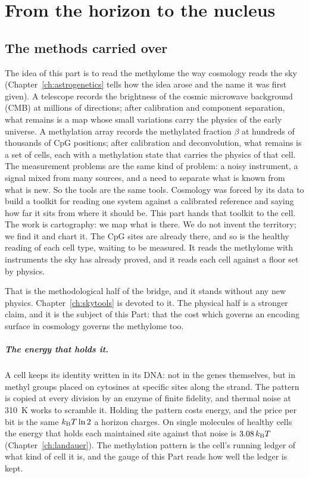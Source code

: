 \chapter{From the horizon to the nucleus}\label{ch:bridge}

\section{The methods carried over}

The idea of this part is to read the methylome the way
cosmology reads the sky (Chapter~\ref{ch:astrogenetics} tells how the idea arose and the name it was first given). A telescope records the brightness of the cosmic microwave background
(CMB) at millions of directions; after calibration and component separation, what remains is a map
whose small variations carry the physics of the early universe. A methylation array records the
methylated fraction $\beta$ at hundreds of thousands of CpG positions; after calibration and
deconvolution, what remains is a set of cells, each with a methylation state that carries the
physics of that cell. The measurement problems are the same kind of problem: a noisy instrument, a
signal mixed from many sources, and a need to separate what is known from what is new. So the
tools are the same tools.
Cosmology was forced by its data to build a toolkit for reading one system against a calibrated reference and saying how far it sits from
where it should be. This part hands that toolkit to the cell. The work is cartography: we map what is there. We do not invent the
territory; we find it and chart it. The CpG sites are already there, and so is the healthy reading of each cell type, waiting to be
measured. It reads the methylome with instruments the sky has already proved, and it reads each cell against a floor set by physics. \analogy

That is the methodological half of the bridge, and it stands without any new physics. Chapter~\ref{ch:skytools} is
devoted to it. The physical half is a stronger claim, and it is the subject of this Part: that the
cost which governs an encoding surface in cosmology governs the methylome too.
\paragraph{The energy that holds it.} A cell keeps its identity written in its DNA: not in the genes themselves, but in methyl groups placed
on cytosines at specific sites along the strand. The pattern is copied at every division by an enzyme of finite fidelity, and thermal noise
at 310~K works to scramble it. Holding the pattern costs energy, and the price per bit is the same $k_{\mathrm B} T\ln2$ a horizon charges. On single
molecules of healthy cells the energy that holds each maintained site against that noise is $3.08\,k_{\mathrm B} T$ (Chapter~\ref{ch:landauer}).
\measured{} The methylation pattern is the cell's running ledger of what kind of cell it is, and the gauge of this Part reads how well
the ledger is kept.

